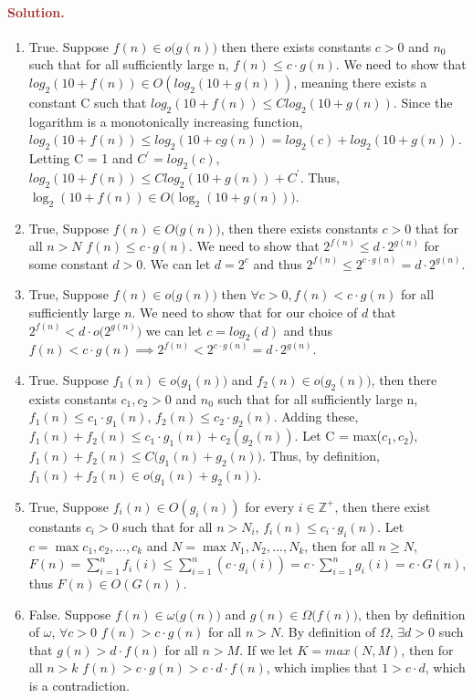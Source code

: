 \paragraph{\textcolor{brown}{Solution.}}
\begin{enumerate}
    \item True. Suppose $f(n) \in o\big(g(n)\big)$ then there exists constants $c > 0$ and $n_0$ such that for all sufficiently large n, $f(n) \le c \cdot g(n)$. We need to show that $log_2(10 + f(n)) \in O(log_2(10 + g(n)))$, meaning there exists a constant C such that $log_2(10+f(n)) \le Clog_2(10+g(n))$. Since the logarithm is a monotonically increasing function, $log_2(10+f(n)) \le log_2(10+cg(n)) = log_2(c) + log_2(10+g(n))$. Letting C = 1 and $C^\prime = log_2(c)$, $log_2(10+f(n)) \le Clog_2(10+g(n)) + C^\prime$. Thus, $\log_2 (10 + f(n)) \in O\big(\log_2 (10 + g(n))\big)$.
    \item True, Suppose $f(n) \in O(g(n)\big)$, then there exists constants $c > 0$ that for all $n > N$ $f(n) \le c \cdot g(n)$. We need to show that $2^{f(n)} \le d \cdot 2^{g(n)}$ for some constant $d > 0$. We can let $d = 2^c$ and thus $2^{f(n)} \le 2^{c \cdot g(n)} = d \cdot 2^{g(n)}$.
    \item True, Suppose $f(n) \in o\big(g(n)\big)$ then $\forall c > 0 , f(n) < c \cdot g(n)$ for all sufficiently large $n$. We need to show that for our choice of $d$ that $2^{f(n)} < d \cdot o\big(2^{g(n)}\big)$ we can let $c = log_2(d)$ and thus $f(n) < c \cdot g(n) \implies 2^{f(n)} < 2^{c \cdot g(n)} = d \cdot 2^{g(n)}$.
    \item True. Suppose $f_1(n) \in o\big(g_1(n))$ and $f_2(n) \in o\big(g_2(n))$, then there exists constants $c_1, c_2 > 0$ and $n_0$ such that for all sufficiently large n, $f_1(n) \le c_1 \cdot g_1(n)$, $f_2(n) \le c_2 \cdot g_2(n)$. Adding these, $f_1(n) + f_2(n) \le c_1 \cdot g_1(n) + c_2(g_2(n))$. Let C = max($c_1, c_2$), $f_1(n) + f_2(n) \le C(g_1(n) + g_2(n)\big)$. Thus, by definition, $f_1(n) + f_2(n) \in o\big(g_1(n) + g_2(n)\big)$.
    \item True, Suppose $f_i(n) \in O(g_i(n))$ for every $i \in \mathbb{Z}^+$, then there exist constants $c_i > 0$ such that for all $n > N_i$, $f_i(n) \le c_i \cdot g_i(n)$. Let $c = \max{c_1, c_2, ..., c_k}$ and $N = \max{N_1, N_2, ..., N_k}$, then for all $n \ge N$, $F(n) = \sum_{i=1}^n f_i(i) \le \sum_{i=1}^n (c \cdot g_i(i)) = c \cdot \sum_{i=1}^n g_i(i) = c \cdot G(n)$, thus $F(n) \in O(G(n))$.
    \item False. Suppose $f(n) \in \omega(g(n)\big)$ and $g(n) \in \Omega\big(f(n)\big)$, then by definition of $\omega$, $\forall c >0$ $f(n) > c \cdot g(n)$ for all $n > N$. By definition of $\Omega$, $\exists d > 0$ such that $g(n) > d \cdot f(n)$ for all $n > M$. If we let $K = max(N,M)$, then for all $n > k$ $f(n) > c \cdot g(n) > c \cdot d \cdot f(n)$, which implies that $1 > c \cdot d$, which is a contradiction.

\end{enumerate}
